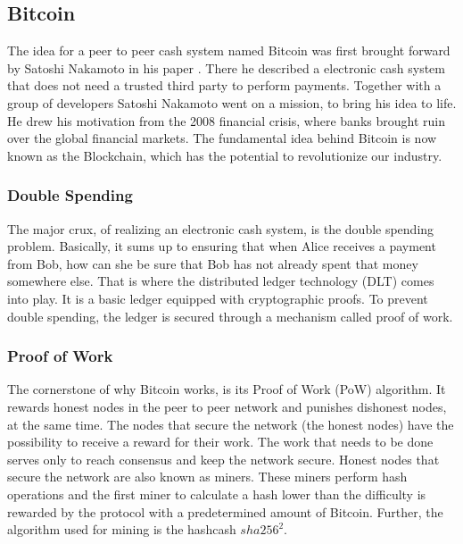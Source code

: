 \subsection{Bitcoin}

The idea for a peer to peer cash system named Bitcoin was first brought forward by Satoshi Nakamoto in his paper \cite{nakamoto2008bitcoin}. There he described a electronic cash system that does not need a trusted third party to perform payments. Together with a group of developers Satoshi Nakamoto went on a mission, to bring his idea to life. He drew his motivation from the 2008 financial crisis, where banks brought ruin over the global financial markets. The fundamental idea behind Bitcoin is now known as the Blockchain, which has the potential to revolutionize our industry.

\subsubsection{Double Spending}

The major crux, of realizing an electronic cash system, is the double spending problem. Basically, it sums up to ensuring that when Alice receives a payment from Bob, how can she be sure that Bob has not already spent that money somewhere else. That is where the distributed ledger technology (DLT) comes into play. It is a basic ledger equipped with cryptographic proofs. To prevent double spending, the ledger is secured through a mechanism called proof of work.

\subsubsection{Proof of Work} 

The cornerstone of why Bitcoin works, is its Proof of Work (PoW) algorithm. It rewards honest nodes in the peer to peer network and punishes dishonest nodes, at the same time. The nodes that secure the network (the honest nodes) have the possibility to receive a reward for their work. The work that needs to be done serves only to reach consensus and keep the network secure. Honest nodes that secure the network are also known as miners. These miners perform hash operations and the first miner to calculate a hash lower than the difficulty is rewarded by the protocol with a predetermined amount of Bitcoin. Further, the algorithm used for mining is the hashcash  $ sha256^2 $. %

